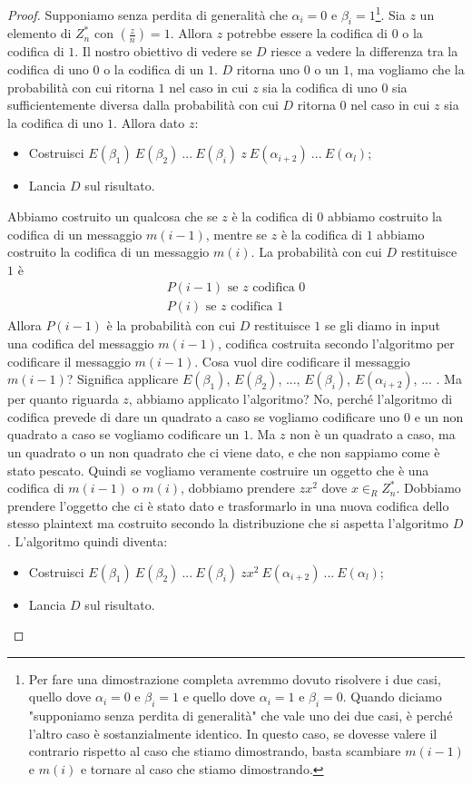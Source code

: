 \begin{proof}
Supponiamo senza perdita di generalità che $\alpha_i = 0$ e $\beta_i = 1$\footnote{Per fare una dimostrazione completa avremmo dovuto risolvere i due casi, quello dove $\alpha_i = 0$ e $\beta_i = 1$ e quello dove $\alpha_i = 1$ e $\beta_i = 0$. Quando diciamo "supponiamo senza perdita di generalità" che vale uno dei due casi, è perché l'altro caso è sostanzialmente identico. In questo caso, se dovesse valere il contrario rispetto al caso che stiamo dimostrando, basta scambiare $m(i-1)$ e $m(i)$ e tornare al caso che stiamo dimostrando.}. Sia $z$ un elemento di $Z_n^*$ con $\left( \frac{z}{n}\right) = 1$. Allora $z$ potrebbe essere la codifica di $0$ o la codifica di $1$. Il nostro obiettivo di vedere se $D$ riesce a vedere la differenza tra la codifica di uno $0$ o la codifica di un $1$. $D$ ritorna uno $0$ o un $1$, ma vogliamo che la probabilità con cui ritorna $1$ nel caso in cui $z$ sia la codifica di uno $0$ sia sufficientemente diversa dalla probabilità con cui $D$ ritorna $0$ nel caso in cui $z$ sia la codifica di uno $1$. 
Allora dato $z$:
\begin{itemize}
    \item Costruisci $E(\beta_1) \ E(\beta_2) \ ... \ E(\beta_i) \ z \ E(\alpha_{i+2}) \ ... \ E(\alpha_l)$;
    \item Lancia $D$ sul risultato.
\end{itemize}
\noindent Abbiamo costruito un qualcosa che se $z$ è la codifica di $0$ abbiamo costruito la codifica di un messaggio $m(i-1)$, mentre se $z$ è la codifica di $1$ abbiamo costruito la codifica di un messaggio $m(i)$. La probabilità con cui $D$ restituisce $1$ è
\begin{align*}
    P(i-1) \text{ se $z$ codifica $0$}\\
    P(i) \text{ se $z$ codifica $1$}
\end{align*}
\noindent Allora $P(i-1)$ è la probabilità con cui $D$ restituisce $1$ se gli diamo in input una codifica del messaggio $m(i-1)$, codifica costruita secondo l'algoritmo per codificare il messaggio $m(i-1)$. Cosa vuol dire codificare il messaggio $m(i-1)$? Significa applicare $E(\beta_1)$, $E(\beta_2)$, ..., $E(\beta_i)$, $E(\alpha_{i+2})$, ... . Ma per quanto riguarda $z$, abbiamo applicato l'algoritmo? No, perché l'algoritmo di codifica prevede di dare un quadrato a caso se vogliamo codificare uno $0$ e un non quadrato a caso se vogliamo codificare un $1$. Ma $z$ non è un quadrato a caso, ma un quadrato o un non quadrato che ci viene dato, e che non sappiamo come è stato pescato. Quindi se vogliamo veramente costruire un oggetto che è una codifica di $m(i-1)$ o $m(i)$, dobbiamo prendere $zx^2$ dove $x \in_R Z_n^*$. Dobbiamo prendere l'oggetto che ci è stato dato e trasformarlo in una nuova codifica dello stesso plaintext ma costruito secondo la distribuzione che si aspetta l'algoritmo $D$. 
L'algoritmo quindi diventa:
\begin{itemize}
    \item Costruisci $E(\beta_1) \ E(\beta_2) \ ... \ E(\beta_i) \ zx^2 \ E(\alpha_{i+2}) \ ... \ E(\alpha_l)$;
    \item Lancia $D$ sul risultato.
\end{itemize}


\end{proof}
